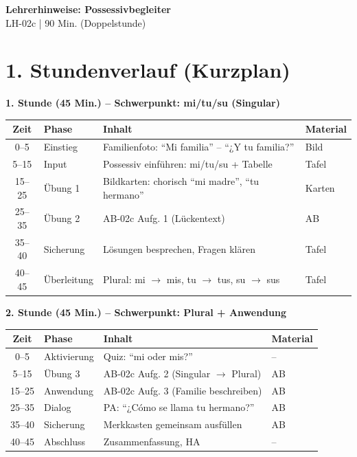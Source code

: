 \documentclass[11pt, a4paper]{article}
\newcommand{\fachfarbe}{spanisch}
\newcommand{\thema}{Possessivbegleiter}
\newcommand{\sequenz}{02}
\newcommand{\block}{c}
\newcommand{\dauer}{90 Min. (Doppelstunde)}
\begin{document}

\begin{center}
    {\Large\bfseries\textcolor{\fachfarbe}{Lehrerhinweise: \thema}}\\[0.3em]
    {\normalsize LH-\sequenz\block{} | \dauer}
\end{center}

\vspace{10pt}


\section*{1. Stundenverlauf (Kurzplan)}

\textbf{1. Stunde (45 Min.) -- Schwerpunkt: mi/tu/su (Singular)}

\begin{tabularx}{\textwidth}{|c|l|X|l|}
\hline
\textbf{Zeit} & \textbf{Phase} & \textbf{Inhalt} & \textbf{Material} \\
\hline
0--5 & Einstieg & Familienfoto: ``Mi familia'' -- ``¿Y tu familia?'' & Bild \\
\hline
5--15 & Input & Possessiv einführen: mi/tu/su + Tabelle & Tafel \\
\hline
15--25 & Übung 1 & Bildkarten: chorisch ``mi madre'', ``tu hermano'' & Karten \\
\hline
25--35 & Übung 2 & AB-02c Aufg. 1 (Lückentext) & AB \\
\hline
35--40 & Sicherung & Lösungen besprechen, Fragen klären & Tafel \\
\hline
40--45 & Überleitung & Plural: mi $\rightarrow$ mis, tu $\rightarrow$ tus, su $\rightarrow$ sus & Tafel \\
\hline
\end{tabularx}

\vspace{1em}

\textbf{2. Stunde (45 Min.) -- Schwerpunkt: Plural + Anwendung}

\begin{tabularx}{\textwidth}{|c|l|X|l|}
\hline
\textbf{Zeit} & \textbf{Phase} & \textbf{Inhalt} & \textbf{Material} \\
\hline
0--5 & Aktivierung & Quiz: ``mi oder mis?'' & -- \\
\hline
5--15 & Übung 3 & AB-02c Aufg. 2 (Singular $\rightarrow$ Plural) & AB \\
\hline
15--25 & Anwendung & AB-02c Aufg. 3 (Familie beschreiben) & AB \\
\hline
25--35 & Dialog & PA: ``¿Cómo se llama tu hermano?'' & AB \\
\hline
35--40 & Sicherung & Merkkasten gemeinsam ausfüllen & AB \\
\hline
40--45 & Abschluss & Zusammenfassung, HA & -- \\
\hline
\end{tabularx}
\end{document}
